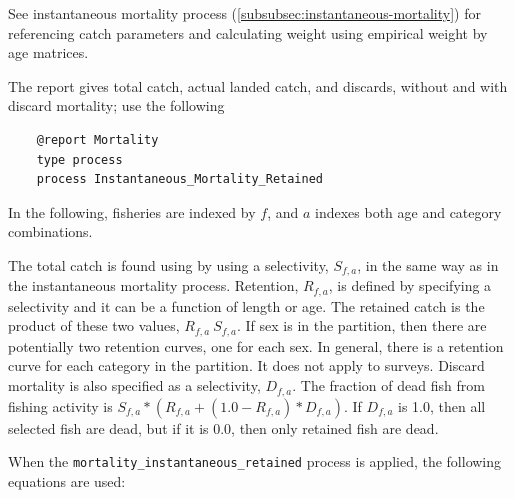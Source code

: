 See instantaneous mortality process (\ref{subsubsec:instantaneous-mortality}) for referencing catch parameters and calculating weight using empirical weight by age matrices.

The report gives total catch, actual landed catch, and discards, without and with discard mortality; use the following

{\small{\begin{verbatim}
    @report Mortality
    type process
    process Instantaneous_Mortality_Retained
    \end{verbatim}}}

In the following, fisheries are indexed by $f$, and $a$ indexes both age and category combinations.

The total catch is found using by using a selectivity, $S_{f,a}$, in the same way as in the instantaneous mortality process. Retention, $R_{f,a}$, is defined by specifying a selectivity and it can be a function of length or age. The retained catch is the product of these two values, $R_{f,a} \ S_{f,a}$. If sex is in the partition, then there are potentially two retention curves, one for each sex. In general, there is a retention curve for each category in the partition. It does not apply to surveys. Discard mortality is also specified as a selectivity, $D_{f,a}$. The fraction of dead fish from fishing activity is $S_{f,a} * ( R_{f,a} + (1.0 - R_{f,a} ) * D_{f,a} )$. If $D_{f,a}$ is 1.0, then all selected fish are dead, but if it is 0.0, then only retained fish are dead.

When the \texttt{mortality\_instantaneous\_retained} process is applied, the following equations are used:

